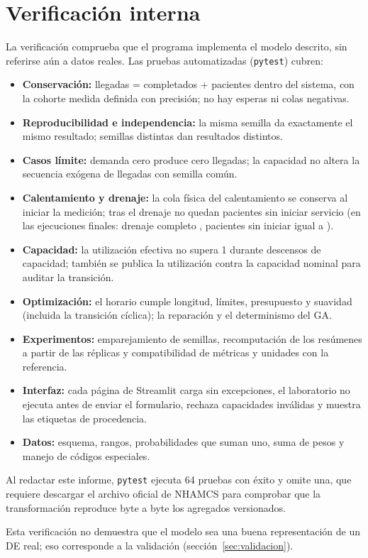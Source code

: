 \section{Verificación interna}

La verificación comprueba que el programa implementa el modelo descrito, sin referirse aún
a datos reales. Las pruebas automatizadas (\texttt{pytest}) cubren:
\begin{itemize}
  \item \textbf{Conservación:} llegadas = completados + pacientes dentro del sistema, con la
  cohorte medida definida con precisión; no hay esperas ni colas negativas.
  \item \textbf{Reproducibilidad e independencia:} la misma semilla da exactamente el mismo
  resultado; semillas distintas dan resultados distintos.
  \item \textbf{Casos límite:} demanda cero produce cero llegadas; la capacidad no altera la
  secuencia exógena de llegadas con semilla común.
  \item \textbf{Calentamiento y drenaje:} la cola física del calentamiento se conserva al
  iniciar la medición; tras el drenaje no quedan pacientes sin iniciar servicio
  (en las \NRuns{} ejecuciones finales: drenaje completo \AllDrained, pacientes sin iniciar
  igual a \MaxNotStarted).
  \item \textbf{Capacidad:} la utilización efectiva no supera 1 durante descensos de
  capacidad; también se publica la utilización contra la capacidad nominal para auditar la
  transición.
  \item \textbf{Optimización:} el horario cumple longitud, límites, presupuesto y suavidad
  (incluida la transición cíclica); la reparación y el determinismo del GA.
  \item \textbf{Experimentos:} emparejamiento de semillas, recomputación de los resúmenes a
  partir de las réplicas y compatibilidad de métricas y unidades con la referencia.
  \item \textbf{Interfaz:} cada página de Streamlit carga sin excepciones, el laboratorio no
  ejecuta antes de enviar el formulario, rechaza capacidades inválidas y muestra las etiquetas
  de procedencia.
  \item \textbf{Datos:} esquema, rangos, probabilidades que suman uno, suma de pesos y
  manejo de códigos especiales.
\end{itemize}
Al redactar este informe, \texttt{pytest} ejecuta 64 pruebas con éxito y omite una, que
requiere descargar el archivo oficial de NHAMCS para comprobar que la transformación
reproduce byte a byte los agregados versionados.

Esta verificación no demuestra que el modelo sea una buena representación de un DE real; eso
corresponde a la validación (sección~\ref{sec:validacion}).
